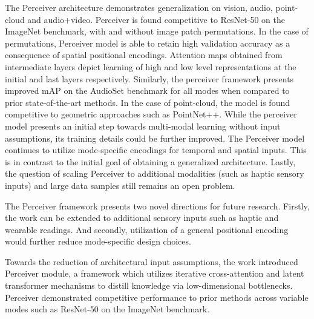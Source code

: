 \documentclass[11pt,letterpaper]{article}
\begin{document}
The Perceiver architecture demonstrates generalization on vision, audio, point-cloud and audio+video. Perceiver is found competitive to ResNet-50 on the ImageNet benchmark, with and without image patch permutations. In the case of permutations, Perceiver model is able to retain high validation accuracy as a consequence of spatial positional encodings. Attention maps obtained from intermediate layers depict learning of high and low level representations at the initial and last layers respectively. Similarly, the perceiver framework presents improved mAP on the AudioSet benchmark for all modes when compared to prior state-of-the-art methods. In the case of point-cloud, the model is found competitive to geometric approaches such as PointNet++. While the perceiver model presents an initial step towards multi-modal learning without input assumptions, its training details could be further improved. The Perceiver model continues to utilize mode-specific encodings for temporal and spatial inputs. This is in contrast to the initial goal of obtaining a generalized architecture. Lastly, the question of scaling Perceiver to additional modalities (such as haptic sensory inputs) and large data samples still remains an open problem.

The Perceiver framework presents two novel directions for future research. Firstly, the work can be extended to additional sensory inputs such as haptic and wearable readings. And secondly, utilization of a general positional encoding would further reduce mode-specific design choices. 

Towards the reduction of architectural input assumptions, the work introduced Perceiver module, a framework which utilizes iterative cross-attention and latent transformer mechanisms to distill knowledge via low-dimensional bottlenecks. Perceiver demonstrated competitive performance to prior methods across variable modes such as ResNet-50 on the ImageNet benchmark. 
\end{document}
